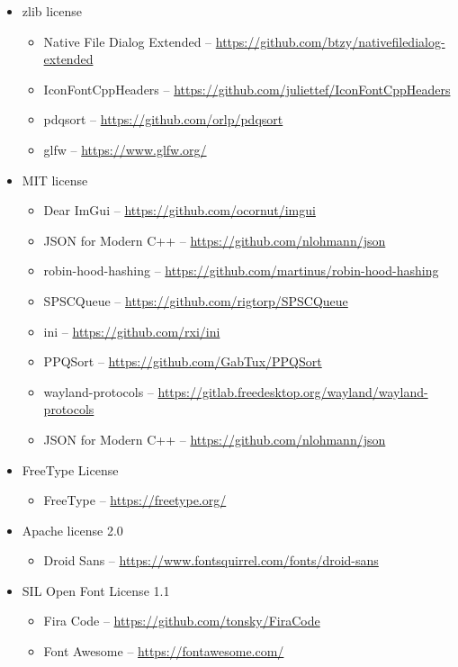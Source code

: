 \documentclass[hidelinks,titlepage,a4paper,twoside]{article}
\begin{document}
\begin{itemize}
\item zlib license
\begin{itemize}
\item Native File Dialog Extended -- \url{https://github.com/btzy/nativefiledialog-extended}
\item IconFontCppHeaders -- \url{https://github.com/juliettef/IconFontCppHeaders}
\item pdqsort -- \url{https://github.com/orlp/pdqsort}
\item glfw -- \url{https://www.glfw.org/}
\end{itemize}

\item MIT license
\begin{itemize}
\item Dear ImGui -- \url{https://github.com/ocornut/imgui}
\item JSON for Modern C++ -- \url{https://github.com/nlohmann/json}
\item robin-hood-hashing -- \url{https://github.com/martinus/robin-hood-hashing}
\item SPSCQueue \faStar{} -- \url{https://github.com/rigtorp/SPSCQueue}
\item ini -- \url{https://github.com/rxi/ini}
\item PPQSort -- \url{https://github.com/GabTux/PPQSort}
\item wayland-protocols -- \url{https://gitlab.freedesktop.org/wayland/wayland-protocols}
\item JSON for Modern C++ -- \url{https://github.com/nlohmann/json}
\end{itemize}

\item FreeType License
\begin{itemize}
\item FreeType -- \url{https://freetype.org/}
\end{itemize}

\item Apache license 2.0
\begin{itemize}
\item Droid Sans -- \url{https://www.fontsquirrel.com/fonts/droid-sans}
\end{itemize}

\item SIL Open Font License 1.1
\begin{itemize}
\item Fira Code -- \url{https://github.com/tonsky/FiraCode}
\item Font Awesome -- \url{https://fontawesome.com/}
\end{itemize}

\end{itemize}



\end{document}
